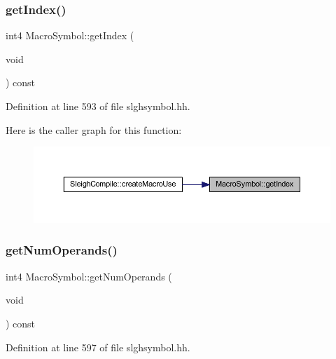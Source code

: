 \subsubsection{\texorpdfstring{getIndex()}{getIndex()}}
{\footnotesize\ttfamily int4 Macro\+Symbol\+::get\+Index (\begin{DoxyParamCaption}\item[{void}]{ }\end{DoxyParamCaption}) const\hspace{0.3cm}{\ttfamily [inline]}}



Definition at line 593 of file slghsymbol.\+hh.

Here is the caller graph for this function\+:
\nopagebreak
\begin{figure}[H]
\begin{center}
\leavevmode
\includegraphics[width=350pt]{class_macro_symbol_ad4ecc16c5e76789e19dd9757f6167e98_icgraph}
\end{center}
\end{figure}
\mbox{\label{class_macro_symbol_a0b0cefad99fd10752c4c18acad7e2310}} 
\subsubsection{\texorpdfstring{getNumOperands()}{getNumOperands()}}
{\footnotesize\ttfamily int4 Macro\+Symbol\+::get\+Num\+Operands (\begin{DoxyParamCaption}\item[{void}]{ }\end{DoxyParamCaption}) const\hspace{0.3cm}{\ttfamily [inline]}}



Definition at line 597 of file slghsymbol.\+hh.

